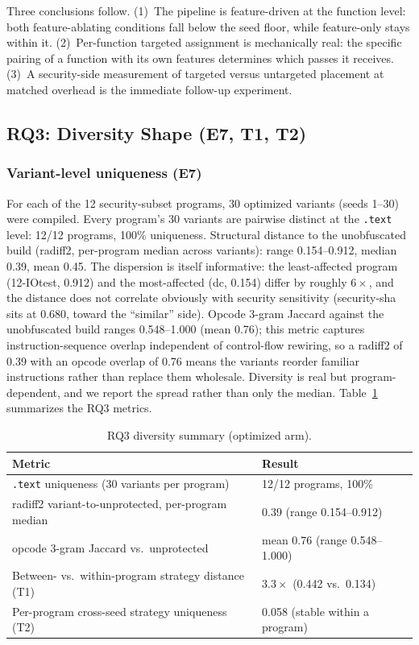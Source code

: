 \documentclass[pdflatex,sn-mathphys-num]{sn-jnl}
\theoremstyle{thmstyleone}%
\theoremstyle{thmstyletwo}%
\theoremstyle{thmstylethree}%
\begin{document}
Three conclusions follow. (1)~The pipeline is feature-driven at the function
level: both feature-ablating conditions fall below the seed floor, while
feature-only stays within it. (2)~Per-function targeted assignment is
mechanically real: the specific pairing of a function with its own features
determines which passes it receives. (3)~A security-side measurement of
targeted versus untargeted placement at matched overhead is the immediate
follow-up experiment.

\subsection{RQ3: Diversity Shape (E7, T1, T2)}
\label{sec:rq3}

\subsubsection{Variant-level uniqueness (E7)}
For each of the 12 security-subset programs, 30 optimized variants (seeds 1--30) were
compiled. Every program's 30 variants are pairwise distinct at the \texttt{.text}
level: 12/12 programs, 100\% uniqueness. Structural distance to the unobfuscated build
(radiff2, per-program median across variants): range 0.154--0.912, median 0.39, mean
0.45. The dispersion is itself informative: the least-affected program (12-IOtest,
0.912) and the most-affected (dc, 0.154) differ by roughly $6\times$, and the distance
does not correlate obviously with security sensitivity (security-sha sits at 0.680,
toward the ``similar'' side). Opcode 3-gram Jaccard against the unobfuscated build
ranges 0.548--1.000 (mean 0.76); this metric captures instruction-sequence overlap
independent of control-flow rewiring, so a radiff2 of 0.39 with an opcode overlap of
0.76 means the variants reorder familiar instructions rather than replace them
wholesale. Diversity is real but program-dependent, and we
report the spread rather than only the median. Table~\ref{tab:e7_diversity}
summarizes the RQ3 metrics.

\begin{table}[!t]
\centering
\footnotesize
\caption{RQ3 diversity summary (optimized arm).}
\label{tab:e7_diversity}
\begin{tabular}{ll}
\toprule
Metric & Result \\
\midrule
\texttt{.text} uniqueness (30 variants per program) & 12/12 programs, 100\% \\
radiff2 variant-to-unprotected, per-program median & 0.39 (range 0.154--0.912) \\
opcode 3-gram Jaccard vs.\ unprotected & mean 0.76 (range 0.548--1.000) \\
Between- vs.\ within-program strategy distance (T1) & $3.3\times$ (0.442 vs.\ 0.134) \\
Per-program cross-seed strategy uniqueness (T2) & 0.058 (stable within a program) \\
\bottomrule
\end{tabular}
\end{table}
\end{document}
